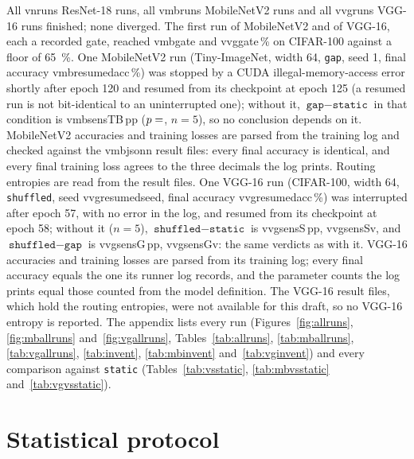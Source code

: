 \documentclass[10pt,a4paper]{article}
\newcommand{\V}[1]{\csname v#1\endcsname}
\begin{document}
All \V{nruns} ResNet-18 runs, all \V{mbruns} MobileNetV2 runs and all
\V{vgruns} VGG-16 runs finished; none diverged. The first run of
MobileNetV2 and of VGG-16, each a recorded gate, reached \V{mbgate} and
\V{vggate}\,\% on CIFAR-100 against a floor of \SI{65}{\percent}. One
MobileNetV2 run (Tiny-ImageNet, width 64, \texttt{gap}, seed 1, final
accuracy \V{mbresumedacc}\,\%) was stopped by a CUDA illegal-memory-access
error shortly after epoch 120 and resumed from its checkpoint at epoch 125
(a resumed run is not bit-identical to an uninterrupted one); without it, $\texttt{gap}-\texttt{static}$ in
that condition is \V{mbsensTB}\,pp ($p=\V{mbsensTBp}$, $n=5$), so no
conclusion depends on it. MobileNetV2 accuracies and training losses are
parsed from the training log and checked against the \V{mbjsonn} result
files: every final accuracy is identical, and every final training loss
agrees to the three decimals the log prints. Routing entropies are read
from the result files. One VGG-16 run (CIFAR-100, width 64,
\texttt{shuffled}, seed \V{vgresumedseed}, final accuracy
\V{vgresumedacc}\,\%) was interrupted after epoch 57, with no error in
the log, and resumed from its checkpoint at epoch 58; without it
($n=5$), $\texttt{shuffled}-\texttt{static}$ is \V{vgsensS}\,pp,
\V{vgsensSv}, and $\texttt{shuffled}-\texttt{gap}$ is \V{vgsensG}\,pp,
\V{vgsensGv}: the same verdicts as with it. VGG-16 accuracies and
training losses are parsed from its training log; every final accuracy
equals the one its runner log records, and the parameter counts the log
prints equal those counted from the model definition. The VGG-16 result
files, which hold the routing entropies, were not available for this
draft, so no VGG-16 entropy is reported. The appendix lists every run
(Figures~\ref{fig:allruns}, \ref{fig:mballruns} and~\ref{fig:vgallruns},
Tables~\ref{tab:allruns}, \ref{tab:mballruns}, \ref{tab:vgallruns},
\ref{tab:invent}, \ref{tab:mbinvent} and~\ref{tab:vginvent}) and every
comparison against \texttt{static} (Tables~\ref{tab:vsstatic},
\ref{tab:mbvsstatic} and~\ref{tab:vgvsstatic}).

\section{Statistical protocol}\label{sec:stats}
\end{document}
